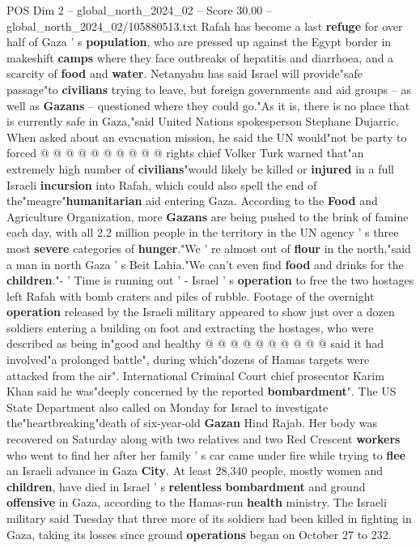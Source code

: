 \begin{textsample}{POS Dim 2 – global\_north\_2024\_02 – Score 30.00 – global\_north\_2024\_02/105880513.txt}
Rafah has become a last \textbf{refuge} for over half of Gaza ' s \textbf{population}, who are pressed up against the Egypt border in makeshift \textbf{camps} where they face outbreaks of hepatitis and diarrhoea, and a scarcity of \textbf{food} and \textbf{water}.
Netanyahu has said Israel will provide"safe passage"to \textbf{civilians} trying to leave, but foreign governments and aid groups -- as well as \textbf{Gazans} -- questioned where they could go."As it is, there is no place that is currently safe in Gaza,"said United Nations spokesperson Stephane Dujarric.
When asked about an evacuation mission, he said the UN would"not be party to forced @ @ @ @ @ @ @ @ @ @ rights chief Volker Turk warned that"an extremely high number of \textbf{civilians}"would likely be killed or \textbf{injured} in a full Israeli \textbf{incursion} into Rafah, which could also spell the end of the"meagre"\textbf{humanitarian} aid entering Gaza.
According to the \textbf{Food} and Agriculture Organization, more \textbf{Gazans} are being pushed to the brink of famine each day, with all 2.2 million people in the territory in the UN agency ' s three most \textbf{severe} categories of \textbf{hunger}."We ' re almost out of \textbf{flour} in the north,"said a man in north Gaza ' s Beit Lahia."We can't even find \textbf{food} and drinks for the \textbf{children}."- ' Time is running out ' - Israel ' s \textbf{operation} to free the two hostages left Rafah with bomb craters and piles of rubble.
Footage of the overnight \textbf{operation} released by the Israeli military appeared to show just over a dozen soldiers entering a building on foot and extracting the hostages, who were described as being in"good and healthy @ @ @ @ @ @ @ @ @ @ said it had involved"a prolonged battle", during which"dozens of Hamas targets were attacked from the air".
International Criminal Court chief prosecutor Karim Khan said he was"deeply concerned by the reported \textbf{bombardment}".
The US State Department also called on Monday for Israel to investigate the"heartbreaking"death of six-year-old \textbf{Gazan} Hind Rajab.
Her body was recovered on Saturday along with two relatives and two Red Crescent \textbf{workers} who went to find her after her family ' s car came under fire while trying to \textbf{flee} an Israeli advance in Gaza \textbf{City}.
At least 28,340 people, mostly women and \textbf{children}, have died in Israel ' s \textbf{relentless} \textbf{bombardment} and ground \textbf{offensive} in Gaza, according to the Hamas-run \textbf{health} ministry.
The Israeli military said Tuesday that three more of its soldiers had been killed in fighting in Gaza, taking its losses since ground \textbf{operations} began on October 27 to 232.

\end{textsample}
